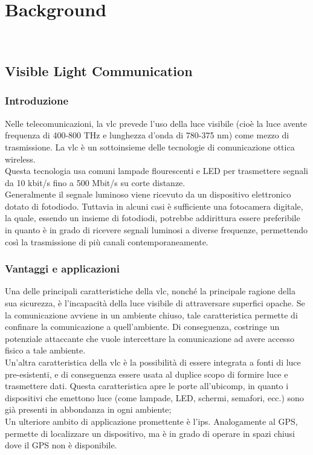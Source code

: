 \chapter{Background}
\label{cap:background}

\\

\section{Visible Light Communication}
\subsection{Introduzione}
Nelle telecomunicazioni, la \gls{vlc} prevede l'uso della luce visibile (cioè la luce avente frequenza di 400-800 THz e lunghezza d'onda di 780-375 nm) come mezzo di trasmissione. La \gls{vlc} è un sottoinsieme delle tecnologie di comunicazione ottica wireless.\\
Questa tecnologia usa comuni lampade flourescenti e LED per trasmettere segnali da 10 kbit/s fino a 500 Mbit/s su corte distanze.\\
Generalmente il segnale luminoso viene ricevuto da un dispositivo elettronico dotato di fotodiodo. Tuttavia in alcuni casi è sufficiente una fotocamera digitale, la quale, essendo un insieme di fotodiodi, potrebbe addirittura essere preferibile in quanto è in grado di ricevere segnali luminosi a diverse frequenze, permettendo così la trasmissione di più canali contemporaneamente.\\

\subsection{Vantaggi e applicazioni}
Una delle principali caratteristiche della \gls{vlc}, nonché la principale ragione della sua sicurezza, è l'incapacità della luce visibile di attraversare superfici opache. Se la comunicazione avviene in un ambiente chiuso, tale caratteristica permette di confinare la comunicazione a quell'ambiente. Di conseguenza, costringe un potenziale attaccante che vuole intercettare la comunicazione ad avere accesso fisico a tale ambiente.\\
Un'altra caratteristica della \gls{vlc} è la possibilità di essere integrata a fonti di luce pre-esistenti, e di conseguenza essere usata al duplice scopo di formire luce e trasmettere dati. Questa caratteristica apre le porte all'\gls{ubicomp}\glsfirstoccur, in quanto i dispositivi che emettono luce (come lampade, LED, schermi, semafori, ecc.) sono già presenti in abbondanza in ogni ambiente;\\
Un ulteriore ambito di applicazione promettente è l'\gls{ips}\glsfirstoccur. Analogamente al GPS, permette di localizzare un dispositivo, ma è in grado di operare in spazi chiusi dove il GPS non è disponibile.\\

